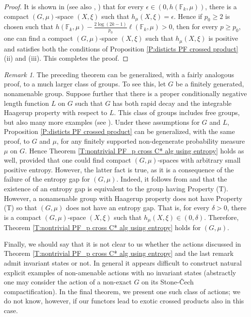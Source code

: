 \documentclass[12pt]{amsart}
\theoremstyle{definition}
\theoremstyle{remark}
\newtheorem{rem}[thm]{Remark}
\numberwithin{equation}{section}
\newcommand{\F}{\mathbb{F}}
\begin{document}
\begin{proof}
It is shown in \cite{HY} (see also \cite{B1}, \cite{BZ1}) that for every $\epsilon \in (0,h(\F_k,\mu))$, there is a compact $(G,\mu)$-space $(X,\xi)$ such that $h_\mu(X,\xi)=\epsilon$. Hence if $p_0\geq 2$ is chosen such that $h(\F_k,\mu)-\frac{2\log (2k-1)}{p_0}\ell(\F_k,\mu)>0$, then for every $p\geq p_0$, one can find a compact $(G,\mu)$-space $(X,\xi)$ such that $h_\mu(X,\xi)$ is positive and satisfies both the conditions of Proposition \ref{P:disticts PF crossed product} (ii) and (iii). This completes the proof.
\end{proof}

\begin{rem}\label{R:nontrivial PF_p cross C* alg using entropy}
    The  preceding theorem can be generalized, with a fairly analogous proof, to a much larger class of groups. To see this, let $G$ be a finitely generated, nonamenable group. Suppose further that there is a proper conditionally negative length function $L$ on $G$ such that $G$ has both rapid decay and the integrable Haagerup property with respect to $L$. This class of groups includes free groups, but also many more examples (see \cite[Examples 5.13, 5.15 and Remark 5.14]{SW2}). Under these assumptions for $G$ and $L$, Proposition \ref{P:disticts PF crossed product} can be generalized, with the same proof, to $G$ and $\mu$, for any finitely supported non-degenerate probability measure $\mu$ on $G$. Hence Theorem \ref{T:nontrivial PF_p cross C* alg using entropy} holds as well, provided that one could find compact $(G,\mu)$-spaces with arbitrary small positive entropy. However, the latter fact is true, as it is a consequence of the failure of the entropy gap for $(G,\mu)$. Indeed, it follows from \cite{BHO} and \cite{Nevo1} that the existence of an entropy gap is equivalent to the group having Property (T). However, a nonamenable group with Haagerup property does not have Property (T) so that $(G,\mu)$ does not have an entropy gap. That is, for every $\delta>0$, there is a compact $(G,\mu)$-space $(X,\xi)$ such that $h_\mu(X,\xi)\in (0,\delta)$. Therefore, Theorem \ref{T:nontrivial PF_p cross C* alg using entropy} holds for $(G,\mu)$.
\end{rem}

Finally, we should say that it is not clear to us whether the actions discussed in Theorem \ref{T:nontrivial PF_p cross C* alg using entropy} and the last remark admit invariant states or not. In general it appears difficult to construct natural explicit examples of non-amenable actions with no invariant states (abstractly one may consider the action  of a non-exact $G$ on its Stone-\v{C}ech compactification). In the final theorem, we present one such class of actions; we do not know, however, if our functors lead to exotic crossed products also in this case.
\end{document}
